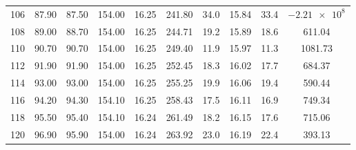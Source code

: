 \begin{table}[H]
\begin{adjustbox}{width=1.2\textwidth, center}
\begin{tabular}{S S[table-format=3.2] S[table-format=3.2] S[table-format=3.2] S[table-format=2.2] S[table-format=3.2] S[table-format=2.1] S[table-format=2.2] S[table-format=3.2] S[table-format=4.2]}
			106                & 87.90               & 87.50               & 154.00                   & 16.25            & 241.80             & 34.0                             & 15.84                                & 33.4                             & {$\num{-2.21e8}$}           \\
			108                & 89.00               & 88.70               & 154.00                   & 16.25            & 244.71             & 19.2                             & 15.89                                & 18.6                             & 611.04                      \\
			110                & 90.70               & 90.70               & 154.00                   & 16.25            & 249.40             & 11.9                             & 15.97                                & 11.3                             & 1081.73                     \\
			112                & 91.90               & 91.90               & 154.00                   & 16.25            & 252.45             & 18.3                             & 16.02                                & 17.7                             & 684.37                      \\
			114                & 93.00               & 93.00               & 154.00                   & 16.25            & 255.25             & 19.9                             & 16.06                                & 19.4                             & 590.44                      \\
			116                & 94.20               & 94.30               & 154.10                   & 16.25            & 258.43             & 17.5                             & 16.11                                & 16.9                             & 749.34                      \\
			118                & 95.50               & 95.40               & 154.10                   & 16.24            & 261.49             & 18.2                             & 16.15                                & 17.6                             & 715.06                      \\
			120                & 96.90               & 95.90               & 154.00                   & 16.24            & 263.92             & 23.0                             & 16.19                                & 22.4                             & 393.13                      \\

\end{tabular}
\end{adjustbox}
\end{table}
